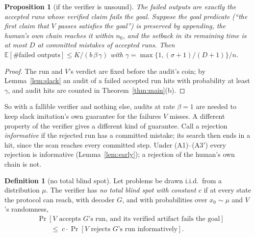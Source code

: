 \documentclass[11pt]{article}
\newtheorem{proposition}[theorem]{Proposition}
\theoremstyle{definition}
\newtheorem{definition}[theorem]{Definition}
\theoremstyle{remark}
\newcommand{\K}{K}
\newcommand{\Ex}{\mathbb{E}}
\begin{document}
\begin{proposition}[if the verifier is unsound]\label{prop:unsound}
The failed outputs are exactly the accepted runs whose verified claim fails the goal. Suppose the goal predicate (``the first claim that $V$ passes satisfies the goal'') is preserved by appending, the human's own chain reaches it within $n_0$, and the setback in its remaining time is at most $D$ at committed mistakes of accepted runs. Then $\Ex[\#\text{failed outputs}]\le\K/(b\,\beta\,\gamma)$ with $\gamma=\max\{1,(\sigma+1)/(D+1)\}/n$.
\end{proposition}
\begin{proof}
The run and $V$'s verdict are fixed before the audit's coin; by Lemma~\ref{lem:slack} an audit of a failed accepted run hits with probability at least $\gamma$, and audit hits are counted in Theorem~\ref{thm:main}(b).
\end{proof}

So with a fallible verifier and nothing else, audits at rate $\beta=1$ are needed to keep slack imitation's own guarantee for the failures $V$ misses. A different property of the verifier gives a different kind of guarantee. Call a rejection \emph{informative} if the rejected run has a committed mistake; its search then ends in a hit, since the scan reaches every committed step. Under (A1)--(A3$'$) every rejection is informative (Lemma~\ref{lem:early}); a rejection of the human's own chain is not.

\begin{definition}[no total blind spot]\label{def:blindspot}
Let problems be drawn i.i.d.\ from a distribution $\mu$. The verifier has \emph{no total blind spot with constant $c$} if at every state the protocol can reach, with decoder $G$, and with probabilities over $x_0\sim\mu$ and $V$'s randomness,
\begin{align*}
&\Pr[\text{$V$ accepts $G$'s run, and its verified artifact fails the goal}]\\
&\qquad\le\; c\cdot\Pr[\text{$V$ rejects $G$'s run informatively}].
\end{align*}
\end{definition}
\end{document}
